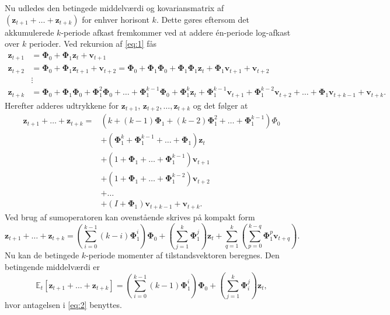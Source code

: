 \documentclass[
  a4paper,
  oneside]{memoir}
\begin{document}
Nu udledes den betingede middelværdi og kovariansmatrix af \((\bm{z}_{t+1}+\dots+\bm{z}_{t+k})\) for enhver horisont \(k\). Dette gøres eftersom det akkumulerede \(k\)-periode afkast fremkommer ved at addere én-periode log-afkast over \(k\) perioder. Ved rekursion af \eqref{eq:1} fås
\begin{align*}
        \bm{z}_{t+1}&=\bm{\Phi}_0+\bm{\Phi}_1 \bm{z}_t+\bm{v}_{t+1}\\
        \bm{z}_{t+2}&=\bm{\Phi}_0+\bm{\Phi}_1 \bm{z}_{t+1}+\bm{v}_{t+2}=\bm{\Phi}_0+\bm{\Phi}_1\bm{\Phi}_0+\bm{\Phi}_1\bm{\Phi}_1 \bm{z}_t +\bm{\Phi}_1 \bm{v}_{t+1}+\bm{v}_{t+2}\\
        &\vdots\\
        \bm{z}_{t+k}&=\bm{\Phi}_0+\bm{\Phi}_1\bm{\Phi}_0+\bm{\Phi}_1^2\bm{\Phi}_0+\dots+\bm{\Phi}_1^{k-1}\bm{\Phi}_0+\bm{\Phi}_1^k \bm{z}_t+\bm{\Phi}_1^{k-1}\bm{v}_{t+1}+\bm{\Phi}_1^{k-2}\bm{v}_{t+2}+\dots+\bm{\Phi}_1 \bm{v}_{t+k-1}+\bm{v}_{t+k}.
    \end{align*}
Herefter adderes udtrykkene for \(\bm{z}_{t+1}\), \(\bm{z}_{t+2},\dots,\bm{z}_{t+k}\) og det følger at
\begin{align*}
        \bm{z}_{t+1}+\dots+\bm{z}_{t+k}=&\left(k+(k-1)\bm{\Phi}_1+(k-2)\bm{\Phi}_1^2+\dots+\bm{\Phi}_1^{k-1}\right)\Phi_0\\
        &+\left(\bm{\Phi}_1^k+\bm{\Phi}_1^{k-1}+\dots+\bm{\Phi}_1\right)\bm{z}_t\\
        &+\left(1+\bm{\Phi}_1+\dots+\bm{\Phi}_1^{k-1}\right)\bm{v}_{t+1}\\
        &+\left(1+\bm{\Phi}_1+\dots+\bm{\Phi}_1^{k-2}\right)\bm{v}_{t+2}\\
        &+\dots\\
        &+(I+\bm{\Phi}_1)\bm{v}_{t+k-1}+\bm{v}_{t+k}.
    \end{align*}
Ved brug af sumoperatoren kan ovenstående skrives på kompakt form
\begin{equation}
        \bm{z}_{t+1}+\dots+\bm{z}_{t+k}=\left(\sum_{i=0}^{k-1} (k-i)\bm{\Phi}_1^i\right)\bm{\Phi}_0+\left(\sum_{j=1}^k \bm{\Phi}_1^j\right)\bm{z}_t+\sum_{q=1}^k\left(\sum_{p=0}^{k-q} \bm{\Phi}_1^p \bm{v}_{t+q}\right).
    \end{equation}
Nu kan de betingede \(k\)-periode momenter af tilstandsvektoren beregnes. Den betingende middelværdi er
\begin{equation}
        \mathbb{E}_t[\bm{z}_{t+1}+\dots+\bm{z}_{t+k}]=\left(\sum_{i=0}^{k-1}(k-1)\bm{\Phi}_1^i\right)\bm{\Phi}_0+\left(\sum_{j=1}^k \bm{\Phi}_i^j\right)\bm{z}_t,
    \end{equation}
hvor antagelsen i \eqref{eq:2} benyttes.
\end{document}
